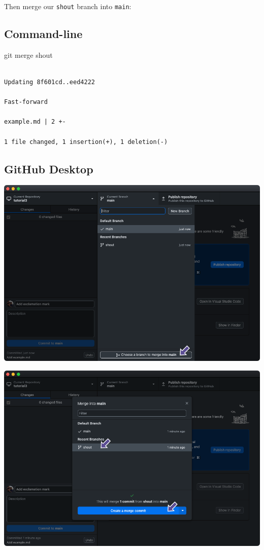 \documentclass[
  letterpaper,
  DIV=11,
  numbers=noendperiod]{scrartcl}
\newenvironment{Shaded}{\begin{snugshade}}{\end{snugshade}}
\newcommand{\NormalTok}[1]{\textcolor[rgb]{0.00,0.23,0.31}{#1}}
\begin{document}
Then merge our \texttt{shout} branch into \texttt{main}:

\subsection{Command-line}

\begin{Shaded}
\begin{Highlighting}[]
\NormalTok{git merge shout}
\end{Highlighting}
\end{Shaded}

\begin{verbatim}

Updating 8f601cd..eed4222

Fast-forward

example.md | 2 +-

1 file changed, 1 insertion(+), 1 deletion(-)
\end{verbatim}

\subsection{GitHub Desktop}

\includegraphics{images/image33.png}

\includegraphics{images/image34.png}
\end{document}
